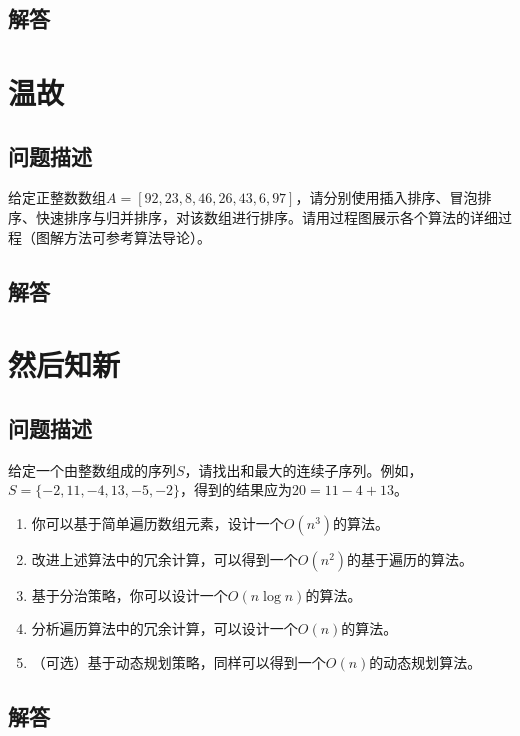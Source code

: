\documentclass{article}
\begin{document}
\subsection{解答}
\section{温故}

\subsection{问题描述}

给定正整数数组$A=[92,23,8,46,26,43,6,97]$，请分别使用插入排序、冒泡排序、快速排序与归并排序，对该数组进行排序。请用过程图展示各个算法的详细过程（图解方法可参考算法导论）。

\subsection{解答}

\section{然后知新}

\subsection{问题描述}

给定一个由整数组成的序列$S$，请找出和最大的连续子序列。例如，$S=\{-2,11,-4,13,-5,-2\}$，得到的结果应为$20=11-4+13$。

\begin{enumerate}
    \item 你可以基于简单遍历数组元素，设计一个$O(n^3)$的算法。
    \item 改进上述算法中的冗余计算，可以得到一个$O(n^2)$的基于遍历的算法。
    \item 基于分治策略，你可以设计一个$O(n\log n)$的算法。
    \item 分析遍历算法中的冗余计算，可以设计一个$O(n)$的算法。
    \item （可选）基于动态规划策略，同样可以得到一个$O(n)$的动态规划算法。
\end{enumerate}

\subsection{解答}
\end{document}
